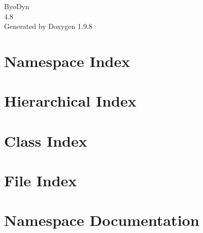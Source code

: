 \documentclass[twoside]{book}
\newcommand{\+}{\discretionary{\mbox{\scriptsize$\hookleftarrow$}}{}{}}
\newcommand{\clearemptydoublepage}{%
    \newpage{\pagestyle{empty}\cleardoublepage}%
  }
\begin{document}
  \raggedbottom
  \begin{titlepage}
  \vspace*{7cm}
  \begin{center}%
  {\Large Byo\+Dyn}\\
  [1ex]\large 4.\+8 \\
  \vspace*{1cm}
  {\large Generated by Doxygen 1.9.8}\\
  \end{center}
  \end{titlepage}
  \clearemptydoublepage
  \tableofcontents
  \clearemptydoublepage

\chapter{Namespace Index}

\chapter{Hierarchical Index}

\chapter{Class Index}

\chapter{File Index}

\chapter{Namespace Documentation}



































\end{document}
